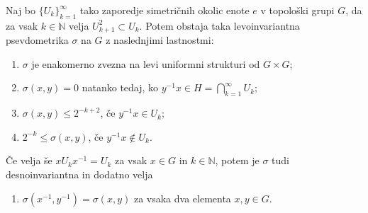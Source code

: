 \documentclass[mat1]{fmfdelo}
\newcommand{\N}{\mathbb N}
\begin{document}
\begin{izrek}\label{izr:pseudometrika}
	Naj bo $\lbrace U_k \rbrace_{k = 1}^{\infty}$ tako zaporedje simetričnih okolic enote $e$ v topološki grupi $G$, da za vsak $k \in \N$ velja $U_{k+1}^2 \subset U_k$. Potem obstaja taka levoinvariantna psevdometrika $\sigma$ na $G$ z naslednjimi lastnostmi:
	\begin{enumerate}
		\item $\sigma$ je enakomerno zvezna na levi uniformni strukturi od $G \times G$;\label{last:psevdo1}
		\item $\sigma (x, y) = 0$ natanko tedaj, ko $y^{-1}x \in H = \bigcap_{k=1}^{\infty} U_k$;\label{last:psevdo2}
		\item $\sigma (x, y) \leq 2^{-k+2}$, če $y^{-1}x \in U_k$;\label{last:psevdo3}
		\item $2^{-k} \leq \sigma (x, y)$, če $y^{-1}x \notin U_k$.\label{last:psevdo4}
	\end{enumerate}
	
	Če velja še $x U_k x^{-1} = U_k$ za vsak $x \in G$ in $k \in \N$, potem je $\sigma$ tudi desnoinvariantna in dodatno velja
	\begin{enumerate}[resume]
		\item $\sigma (x^{-1}, y^{-1}) = \sigma (x, y)$ za vsaka dva elementa $x, y \in G$.\label{last:psevdo5}
	\end{enumerate}
\end{izrek}
\end{document}
